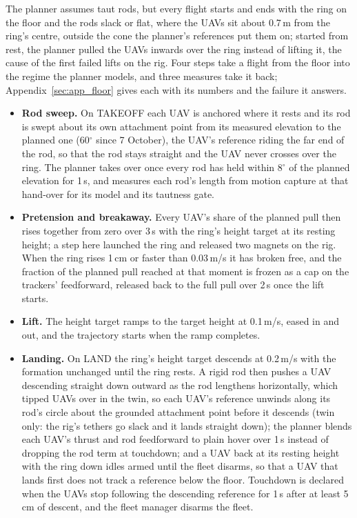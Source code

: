 The planner assumes taut rods, but every flight starts and ends with the ring on the floor and the rods slack or
flat, where the UAVs sit about 0.7\,m from the ring's centre, outside the cone the planner's references put them
on; started from rest, the planner pulled the UAVs inwards over the ring instead of lifting it, the cause of the
first failed lifts on the rig. Four steps take a flight from the floor into the regime the planner models, and three
measures take it back; Appendix~\ref{sec:app_floor} gives each with its numbers and the failure it answers.
\begin{itemize}
    \item \textbf{Rod sweep.} On TAKEOFF each UAV is anchored where it rests and its rod is swept about its own
    attachment point from its measured elevation to the planned one (60$^\circ$ since 7 October), the UAV's
    reference riding the far end of the rod, so that the rod stays straight and the UAV never crosses over the
    ring. The planner takes over once every rod has held within 8$^\circ$ of the planned elevation for 1\,s, and
    measures each rod's length from motion capture at that hand-over for its model and its tautness gate.
    \item \textbf{Pretension and breakaway.} Every UAV's share of the planned pull then rises together from zero
    over 3\,s with the ring's height target at its resting height; a step here launched the ring and released two
    magnets on the rig. When the ring rises 1\,cm or faster than 0.03\,m/s it has broken free, and the fraction of
    the planned pull reached at that moment is frozen as a cap on the trackers' feedforward, released back to the
    full pull over 2\,s once the lift starts.
    \item \textbf{Lift.} The height target ramps to the target height at 0.1\,m/s, eased in and out, and the
    trajectory starts when the ramp completes.
    \item \textbf{Landing.} On LAND the ring's height target descends at 0.2\,m/s with the formation unchanged
    until the ring rests. A rigid rod then pushes a UAV descending straight down outward as the rod lengthens
    horizontally, which tipped UAVs over in the twin, so each UAV's reference unwinds along its rod's circle about
    the grounded attachment point before it descends (twin only: the rig's tethers go slack and it lands straight
    down); the planner blends each UAV's thrust and rod feedforward to plain hover over 1\,s instead of dropping
    the rod term at touchdown; and a UAV back at its resting height with the ring down idles armed until the fleet
    disarms, so that a UAV that lands first does not track a reference below the floor. Touchdown is declared when
    the UAVs stop following the descending reference for 1\,s after at least 5\,cm of descent, and the fleet
    manager disarms the fleet.
\end{itemize}
